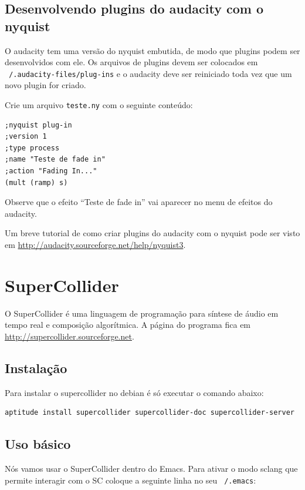 \documentclass[12pt,brazil]{book}
\begin{document}
\section{Desenvolvendo plugins do audacity com o nyquist}
\label{sec:desenv-plug-do}

O audacity tem uma versão do nyquist embutida, de modo que plugins
podem ser desenvolvidos com ele. Os arquivos de plugins devem ser
colocados em \texttt{~/.audacity-files/plug-ins} e o audacity deve ser
reiniciado toda vez que um novo plugin for criado. 

Crie um arquivo \texttt{teste.ny} com o seguinte conteúdo:

\begin{verbatim}
;nyquist plug-in
;version 1
;type process
;name "Teste de fade in"
;action "Fading In..."
(mult (ramp) s)
\end{verbatim}

Observe que o efeito ``Teste de fade in'' vai aparecer no menu de
efeitos do audacity.

Um breve tutorial de como criar plugins do audacity com o nyquist pode
ser visto em \url{http://audacity.sourceforge.net/help/nyquist3}.

\chapter{SuperCollider}
\label{cha:supercollider}

O SuperCollider é uma linguagem de programação para síntese de áudio
em tempo real e composição algorítmica. A página do programa fica em
\url{http://supercollider.sourceforge.net}.

\section{Instalação}
\label{sec:instalacao-2}

Para instalar o supercollider no debian é só executar o comando
abaixo:

\begin{verbatim}
aptitude install supercollider supercollider-doc supercollider-server
\end{verbatim}

\section{Uso básico}
\label{sec:uso-basico-1}

Nós vamos usar o SuperCollider dentro do Emacs. Para ativar o modo
sclang que permite interagir com o SC coloque a seguinte linha no seu
\texttt{~/.emacs}:
\end{document}
